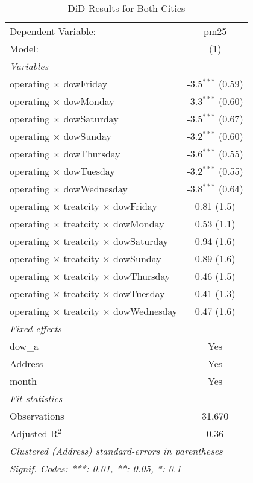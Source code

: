 
\begin{table}[htbp]
   \caption{DiD Results for Both Cities}
   \centering
   \begin{tabular}{lc}
      \tabularnewline \midrule \midrule
      Dependent Variable:                                  & pm25\\  
      Model:                                               & (1)\\  
      \midrule
      \emph{Variables}\\
      operating $\times$ dowFriday                         & -3.5$^{***}$ (0.59)\\   
      operating $\times$ dowMonday                         & -3.3$^{***}$ (0.60)\\   
      operating $\times$ dowSaturday                       & -3.5$^{***}$ (0.67)\\   
      operating $\times$ dowSunday                         & -3.2$^{***}$ (0.60)\\   
      operating $\times$ dowThursday                       & -3.6$^{***}$ (0.55)\\   
      operating $\times$ dowTuesday                        & -3.2$^{***}$ (0.55)\\   
      operating $\times$ dowWednesday                      & -3.8$^{***}$ (0.64)\\   
      operating $\times$ treatcity $\times$ dowFriday      & 0.81 (1.5)\\   
      operating $\times$ treatcity $\times$ dowMonday      & 0.53 (1.1)\\   
      operating $\times$ treatcity $\times$ dowSaturday    & 0.94 (1.6)\\   
      operating $\times$ treatcity $\times$ dowSunday      & 0.89 (1.6)\\   
      operating $\times$ treatcity $\times$ dowThursday    & 0.46 (1.5)\\   
      operating $\times$ treatcity $\times$ dowTuesday     & 0.41 (1.3)\\   
      operating $\times$ treatcity $\times$ dowWednesday   & 0.47 (1.6)\\   
      \midrule
      \emph{Fixed-effects}\\
      dow\_a                                               & Yes\\  
      Address                                              & Yes\\  
      month                                                & Yes\\  
      \midrule
      \emph{Fit statistics}\\
      Observations                                         & 31,670\\  
      Adjusted R$^2$                                       & 0.36\\  
      \midrule \midrule
      \multicolumn{2}{l}{\emph{Clustered (Address) standard-errors in parentheses}}\\
      \multicolumn{2}{l}{\emph{Signif. Codes: ***: 0.01, **: 0.05, *: 0.1}}\\
   \end{tabular}
\end{table}


